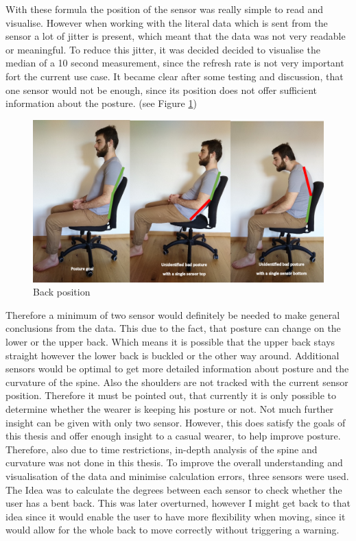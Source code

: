 With these formula the position of the sensor was really simple to read and visualise. However when working with the literal data which is sent from the sensor a lot of jitter is present, which meant that the data was not very readable or meaningful. To reduce this jitter, it was decided decided to visualise the median of a 10 second measurement, since the refresh rate is not very important fort the current use case. It became clear after some testing and discussion, that one sensor would not be enough, since its position does not offer sufficient information about the posture. (see Figure \ref{fig:BackPos})

\begin{figure}[h]
  \begin{center}
\includegraphics[width=\textwidth]{images/Backposition.png}
  \end{center}
  \caption{Back position}
  \label{fig:BackPos}
\end{figure}

Therefore a minimum of two sensor would definitely be needed to make general conclusions from the data. This due to the fact, that posture can change on the lower or the upper back. Which means it is possible that the upper back stays straight however the lower back is buckled or the other way around. Additional sensors would be optimal to get more detailed information about posture and the curvature of the spine. Also the shoulders are not tracked with the current sensor position. Therefore it must be pointed out, that currently it is only possible to determine whether the wearer is keeping his posture or not. Not much further insight can be given with only two sensor. However, this does satisfy the goals of this thesis and offer enough insight to a casual wearer, to help improve posture. Therefore, also due to time restrictions, in-depth analysis of the spine and curvature was not done in this thesis. To improve the overall understanding and visualisation of the data and minimise calculation errors, three sensors were used. The Idea was to calculate the degrees between each sensor to check whether the user has a bent back. This was later overturned, however I might get back to that idea since it would enable the user to have more flexibility when moving, since it would allow for the whole back to move correctly without triggering a warning.

